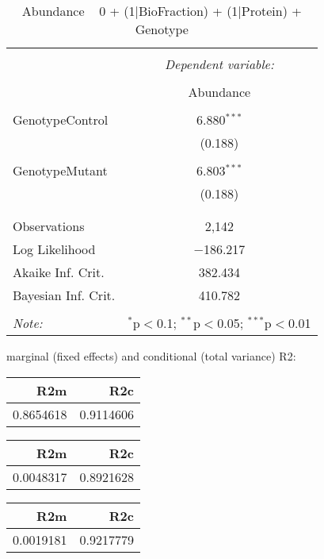 \documentclass[11pt]{report}
\begin{document}
\begin{table}[!htbp] \centering 
  \caption{Abundance ~ 0 + (1|BioFraction) + (1|Protein) + Genotype} 
  \label{} 
\begin{tabular}{@{\extracolsep{5pt}}lc} 
\\[-1.8ex]\hline 
\hline \\[-1.8ex] 
 & \multicolumn{1}{c}{\textit{Dependent variable:}} \\ 
\cline{2-2} 
\\[-1.8ex] & Abundance \\ 
\hline \\[-1.8ex] 
 GenotypeControl & 6.880$^{***}$ \\ 
  & (0.188) \\ 
  & \\ 
 GenotypeMutant & 6.803$^{***}$ \\ 
  & (0.188) \\ 
  & \\ 
\hline \\[-1.8ex] 
Observations & 2,142 \\ 
Log Likelihood & $-$186.217 \\ 
Akaike Inf. Crit. & 382.434 \\ 
Bayesian Inf. Crit. & 410.782 \\ 
\hline 
\hline \\[-1.8ex] 
\textit{Note:}  & \multicolumn{1}{r}{$^{*}$p$<$0.1; $^{**}$p$<$0.05; $^{***}$p$<$0.01} \\ 
\end{tabular} 
\end{table} 
marginal (fixed effects) and conditional (total variance) R2:

\begin{tabular}{r|r}
\hline
R2m & R2c\\
\hline
0.8654618 & 0.9114606\\
\hline
\end{tabular}

\begin{tabular}{r|r}
\hline
R2m & R2c\\
\hline
0.0048317 & 0.8921628\\
\hline
\end{tabular}

\begin{tabular}{r|r}
\hline
R2m & R2c\\
\hline
0.0019181 & 0.9217779\\
\hline
\end{tabular}
\end{document}
